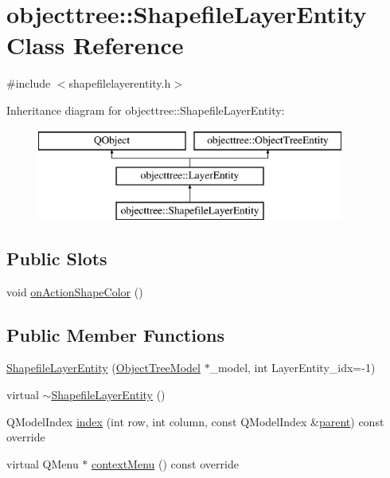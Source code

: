 \hypertarget{classobjecttree_1_1_shapefile_layer_entity}{}\section{objecttree\+::Shapefile\+Layer\+Entity Class Reference}
\label{classobjecttree_1_1_shapefile_layer_entity}


{\ttfamily \#include $<$shapefilelayerentity.\+h$>$}

Inheritance diagram for objecttree\+::Shapefile\+Layer\+Entity\+:\begin{figure}[H]
\begin{center}
\leavevmode
\includegraphics[height=3.000000cm]{d0/d38/classobjecttree_1_1_shapefile_layer_entity}
\end{center}
\end{figure}
\subsection*{Public Slots}
\begin{DoxyCompactItemize}
\item 
void \mbox{\hyperlink{classobjecttree_1_1_shapefile_layer_entity_a490911b1ac9944424ccd7ddc8a530573}{on\+Action\+Shape\+Color}} ()
\end{DoxyCompactItemize}
\subsection*{Public Member Functions}
\begin{DoxyCompactItemize}
\item 
\mbox{\hyperlink{classobjecttree_1_1_shapefile_layer_entity_a4d889e7a11e02805dabc97b1a0c397e2}{Shapefile\+Layer\+Entity}} (\mbox{\hyperlink{class_object_tree_model}{Object\+Tree\+Model}} $\ast$\+\_\+model, int Layer\+Entity\+\_\+idx=-\/1)
\item 
virtual \mbox{\hyperlink{classobjecttree_1_1_shapefile_layer_entity_ad16a6d6b38c3734de1a864a19fec24dc}{$\sim$\+Shapefile\+Layer\+Entity}} ()
\item 
Q\+Model\+Index \mbox{\hyperlink{classobjecttree_1_1_shapefile_layer_entity_a05d31fc56c4c57c919bd1bab7fd31ca9}{index}} (int row, int column, const Q\+Model\+Index \&\mbox{\hyperlink{classobjecttree_1_1_layer_entity_a68d36c7d2efe34d58e47d412e7cdd5b7}{parent}}) const override
\item 
virtual Q\+Menu $\ast$ \mbox{\hyperlink{classobjecttree_1_1_shapefile_layer_entity_a576599710112cc0f18dc6ae86ae317c3}{context\+Menu}} () const override
\end{DoxyCompactItemize}
